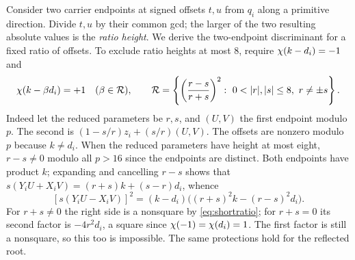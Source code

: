 Consider two carrier endpoints at signed offsets $t,u$ from $q_i$ along a primitive direction. Divide $t,u$ by their common gcd; the larger of the two resulting absolute values is the \emph{ratio height}. We derive the two-endpoint discriminant for a fixed ratio of offsets. To exclude ratio heights at most 8, require $\chi(k-d_i)=-1$ and
\begin{equation}\label{eq:shortratio}
 \ch(k-\beta d_i)=+1\quad(\beta\in\R),\qquad
 \R=\left\{\left(\frac{r-s}{r+s}\right)^2:\ 0<|r|,|s|\le8,\ r\ne\pm s\right\}.
\end{equation}
Indeed let the reduced parameters be $r,s$, and $(U,V)$ the first endpoint modulo $p$. The second is $(1-s/r)z_i+(s/r)(U,V)$. The offsets are nonzero modulo $p$ because $k\ne d_i$. When the reduced parameters have height at most eight, $r-s\ne0$ modulo all $p>16$ since the endpoints are distinct. Both endpoints have product $k$; expanding and cancelling $r-s$ shows that $s(Y_iU+X_iV)=(r+s)k+(s-r)d_i$, whence
\[
 [s(Y_iU-X_iV)]^2=(k-d_i)\big((r+s)^2k-(r-s)^2d_i\big).
\]
For $r+s\ne0$ the right side is a nonsquare by \eqref{eq:shortratio}; for $r+s=0$ its second factor is $-4r^2d_i$, a square since $\chi(-1)=\chi(d_i)=1$. The first factor is still a nonsquare, so this too is impossible. The same protections hold for the reflected root.


